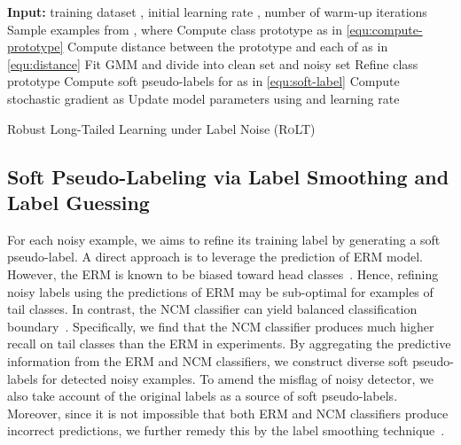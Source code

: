 \documentclass{article}
\def\algo{{\textsc{RoLT}}}
\begin{document}
\begin{algorithm}[htbp]
\DontPrintSemicolon

    
    \textbf{Input:} training dataset , initial learning rate , number of warm-up iterations   \;
    \For{}
    {
        Sample  examples  from \;
        , where  \;
    }
    \For{}
    {
         \;
        \For{}
        {
            Compute class prototype  as in \eqref{equ:compute-prototype}\;
            Compute distance between the prototype  and each of  as in \eqref{equ:distance}\;
            Fit GMM and divide  into clean set  and noisy set \;
            Refine class prototype  
        }
        Compute soft pseudo-labels  for  as in \eqref{equ:soft-label} \;
        Compute stochastic gradient  as \;
        Update model parameters using  and learning rate \;
    }
    \caption{Robust Long-Tailed Learning under Label Noise (\algo)}\label{alg:pseudo-code}
\end{algorithm}


\subsection{Soft Pseudo-Labeling via Label Smoothing and Label Guessing}
For each noisy example, we aims to refine its training label by generating a soft pseudo-label. A direct approach is to leverage the prediction of ERM model. However, the ERM is known to be biased toward head classes~\cite{DBLP:journals/corr/abs-2104-00466}. Hence, refining noisy labels using the predictions of ERM may be sub-optimal for examples of tail classes. In contrast, the NCM classifier can yield balanced classification boundary~\cite{DBLP:conf/iclr/KangXRYGFK20}. Specifically, we find that the NCM classifier produces much higher recall on tail classes than the ERM in experiments. By aggregating the predictive information from the ERM and NCM classifiers, we construct diverse soft pseudo-labels for detected noisy examples. To amend the misflag of noisy detector, we also take account of the original labels as a source of soft pseudo-labels. Moreover, since it is not impossible that both ERM and NCM classifiers produce incorrect predictions, we further remedy this by the label smoothing technique~\cite{DBLP:journals/corr/abs-2104-00466}.
\end{document}

